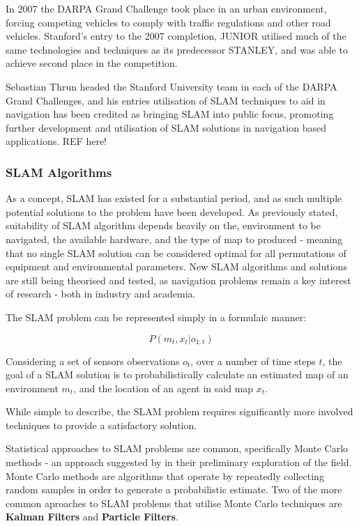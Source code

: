 In 2007 the DARPA Grand Challenge took place in an urban environment, forcing
competing vehicles to comply with traffic regulations and other road vehicles.
Stanford's entry to the 2007 completion, JUNIOR utilised much of the same
technologies and techniques as its predecessor STANLEY, and was able to achieve
second place in the competition.

Sebastian Thrun headed the Stanford University team in each of the DARPA Grand
Challenges, and his entries utilisation of SLAM techniques to aid in
navigation has been credited as bringing SLAM into public focus, promoting
further development and utilisation of SLAM solutions in navigation based
applications. REF here!

\subsubsection{SLAM Algorithms}
As a concept, SLAM has existed for a substantial period, and as such multiple
potential solutions to the problem have been developed.
As previously stated, suitability of SLAM algorithm depends heavily on the,
environment to be navigated, the available hardware, and the type of map to
produced - meaning that no single SLAM solution can be considered optimal for
all permutations of equipment and environmental parameters.
New SLAM algorithms and solutions are still being theorised and tested, as
navigation problems remain a key interest of research - both in industry and
academia.

The SLAM problem can be represented simply in a formulaic manner:

\[ P(m_t,x_t|o_{1:t}) \]

Considering a set of sensors observations \(o_t \), over a number of time
steps \(t\), the goal of a SLAM solution is to probabilistically calculate an
estimated map of an environment \(m_t\), and the location of an agent in said
map \(x_t\).

While simple to describe, the SLAM problem requires significantly more
involved techniques to provide a satisfactory solution.

Statistical approaches to SLAM problems are common, specifically Monte Carlo
methods - an approach suggested by \citeauthor{Smith1986} in their preliminary
exploration of the field.
Monte Carlo methods are algorithms that operate by repeatedly collecting
random samples in order to generate a probabilistic estimate.
Two of the more common aproaches to SLAM problems that utilise Monte Carlo
techniques are {\bf Kalman Filters} and {\bf Particle Filters}.

